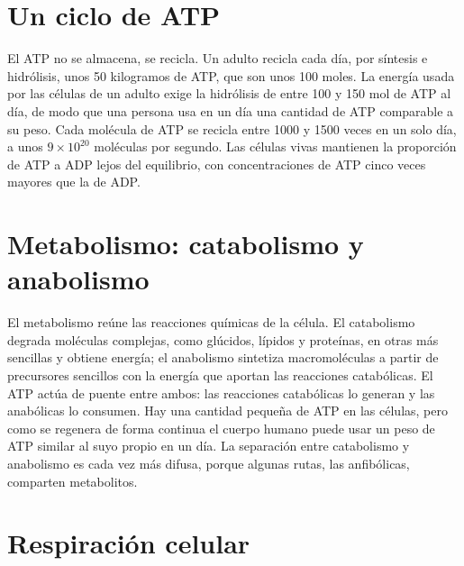 \documentclass{book}
\begin{document}

\section{Un ciclo de ATP}

El ATP no se almacena, se recicla. Un adulto recicla cada día, por síntesis e hidrólisis, unos 50 kilogramos de ATP, que son unos 100 moles. La energía usada por las células de un adulto exige la hidrólisis de entre 100 y 150 mol de ATP al día, de modo que una persona usa en un día una cantidad de ATP comparable a su peso. Cada molécula de ATP se recicla entre 1000 y 1500 veces en un solo día, a unos \(9\times10^{20}\) moléculas por segundo. Las células vivas mantienen la proporción de ATP a ADP lejos del equilibrio, con concentraciones de ATP cinco veces mayores que la de ADP.


\section{Metabolismo: catabolismo y anabolismo}

El metabolismo reúne las reacciones químicas de la célula. El catabolismo degrada moléculas complejas, como glúcidos, lípidos y proteínas, en otras más sencillas y obtiene energía; el anabolismo sintetiza macromoléculas a partir de precursores sencillos con la energía que aportan las reacciones catabólicas. El ATP actúa de puente entre ambos: las reacciones catabólicas lo generan y las anabólicas lo consumen. Hay una cantidad pequeña de ATP en las células, pero como se regenera de forma continua el cuerpo humano puede usar un peso de ATP similar al suyo propio en un día. La separación entre catabolismo y anabolismo es cada vez más difusa, porque algunas rutas, las anfibólicas, comparten metabolitos.


\section{Respiración celular}
\end{document}
